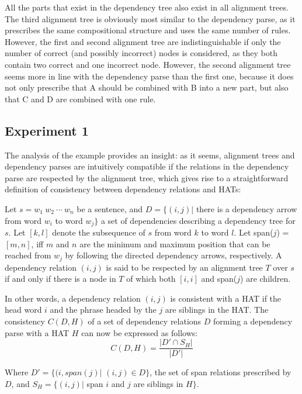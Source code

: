 All the parts that exist in the dependency tree also exist in all alignment trees. The third alignment tree is obviously most similar to the dependency parse, as it prescribes the same compositional structure and uses the same number of rules. However, the first and second alignment tree are indistinguishable if only the number of correct (and possibly incorrect) nodes is considered, as they both contain two correct and one incorrect node. However, the second alignment tree seems more in line with the dependency parse than the first one, because it does not only prescribe that A should be combined with B into a new part, but also that C and D are combined with one rule.

\subsection{Experiment 1}

The analysis of the example provides an insight: as it seems, alignment trees and dependency parses are intuitively compatible if the relations in the dependency parse are respected by the alignment tree, which gives rise to a straightforward definition of consistency between dependency relations and HATs:

\begin{definition}\label{def:depHAT}
Let $s = w_1~w_2~\cdots~w_n$ be a sentence, and $D = \{ (i,j) |$ there is a dependency arrow from word $w_i$ to word $w_j \}$ a set of dependencies describing a dependency tree for $s$. Let $[k,l]$ denote the subsequence of $s$ from word $k$ to word $l$. Let span($j$) = $[m,n]$, iff $m$ and $n$ are the minimum and maximum position that can be reached from $w_j$ by following the directed dependency arrows, respectively. A dependency relation $(i,j)$ is said to be respected by an alignment tree $T$ over $s$ if and only if there is a node in $T$ of which both $[i,i]$ and span($j$) are children.
\end{definition}

In other words, a dependency relation $(i,j)$ is consistent with a HAT if the head word $i$ and the phrase headed by the $j$ are siblings in the HAT. The consistency $C(D,H)$ of a set of dependency relations $D$ forming a dependency parse with a HAT $H$ can now be expressed as follows:
$$
C(D,H) = \frac{|D'\cap S_H|}{|D'|}
$$

\noindent Where $D' = \{(i,span(j) |$ $(i,j)\in D\}$, the set of span relations prescribed by $D$, and $S_H = \{(i,j)|$ span $i$ and $j$ are siblings in $H\}$.

